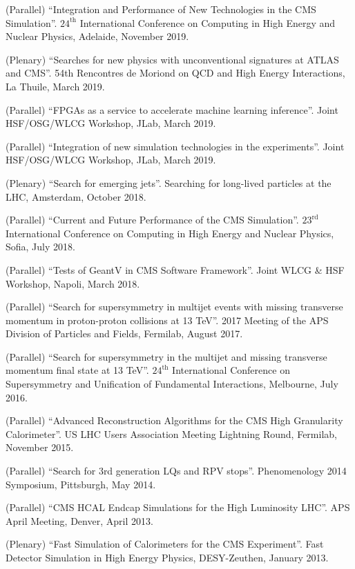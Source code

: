 \begin{description}[leftmargin=12pt,font=\normalfont,labelsep=0em]
\item (Parallel) ``Integration and Performance of New Technologies in the CMS Simulation''. $24^{\text{th}}$ International Conference on Computing in High Energy and Nuclear Physics, Adelaide, November 2019.
\item (Plenary) ``Searches for new physics with unconventional signatures at ATLAS and CMS''. 54th Rencontres de Moriond on QCD and High Energy Interactions, La Thuile, March 2019.
\item (Parallel) ``FPGAs as a service to accelerate machine learning inference''. Joint HSF/OSG/WLCG Workshop, JLab, March 2019.
\item (Parallel) ``Integration of new simulation technologies in the experiments''. Joint HSF/OSG/WLCG Workshop, JLab, March 2019.
\item (Plenary) ``Search for emerging jets''. Searching for long-lived particles at the LHC, Amsterdam, October 2018.
\item (Parallel) ``Current and Future Performance of the CMS Simulation''. $23^{\text{rd}}$ International Conference on Computing in High Energy and Nuclear Physics, Sofia, July 2018.
\item (Parallel) ``Tests of GeantV in CMS Software Framework''. Joint WLCG \& HSF Workshop, Napoli, March 2018.
\item (Parallel) ``Search for supersymmetry in multijet events with missing transverse momentum in proton-proton collisions at 13 TeV''. 2017 Meeting of the APS Division of Particles and Fields, Fermilab, August 2017.
\item (Parallel) ``Search for supersymmetry in the multijet and missing transverse momentum final state at 13 TeV''. $24^{\text{th}}$ International Conference on Supersymmetry and Unification of Fundamental Interactions, Melbourne, July 2016.
\item (Parallel) ``Advanced Reconstruction Algorithms for the CMS High Granularity Calorimeter''. US LHC Users Association Meeting Lightning Round, Fermilab, November 2015.
\item (Parallel) ``Search for 3rd generation LQs and RPV stops''. Phenomenology 2014 Symposium, Pittsburgh, May 2014.
\item (Parallel) ``CMS HCAL Endcap Simulations for the High Luminosity LHC''. APS April Meeting, Denver, April 2013.
\item (Plenary) ``Fast Simulation of Calorimeters for the CMS Experiment''. Fast Detector Simulation in High Energy Physics, DESY-Zeuthen, January 2013.
\end{description}

